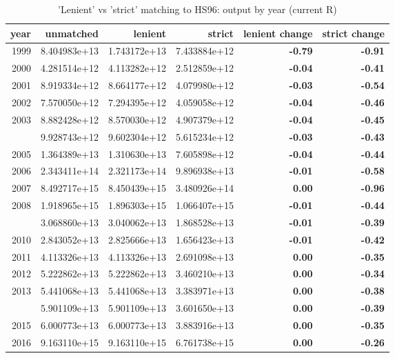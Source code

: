 \begin{table}

\caption{\label{tab:}'Lenient' vs 'strict' matching to HS96: output by year (current R)}
\centering
\begin{tabular}[t]{rrrr>{\bfseries}r>{\bfseries}r}
\toprule
year & unmatched & lenient & strict & lenient change & strict change\\
\midrule
1999 & 8.404983e+13 & 1.743172e+13 & 7.433884e+12 & -0.79 & -0.91\\
2000 & 4.281514e+12 & 4.113282e+12 & 2.512859e+12 & -0.04 & -0.41\\
2001 & 8.919334e+12 & 8.664177e+12 & 4.079980e+12 & -0.03 & -0.54\\
2002 & 7.570050e+12 & 7.294395e+12 & 4.059058e+12 & -0.04 & -0.46\\
2003 & 8.882428e+12 & 8.570030e+12 & 4.907379e+12 & -0.04 & -0.45\\
\addlinespace
2004 & 9.928743e+12 & 9.602304e+12 & 5.615234e+12 & -0.03 & -0.43\\
2005 & 1.364389e+13 & 1.310630e+13 & 7.605898e+12 & -0.04 & -0.44\\
2006 & 2.343411e+14 & 2.321173e+14 & 9.896938e+13 & -0.01 & -0.58\\
2007 & 8.492717e+15 & 8.450439e+15 & 3.480926e+14 & 0.00 & -0.96\\
2008 & 1.918965e+15 & 1.896303e+15 & 1.066407e+15 & -0.01 & -0.44\\
\addlinespace
2009 & 3.068860e+13 & 3.040062e+13 & 1.868528e+13 & -0.01 & -0.39\\
2010 & 2.843052e+13 & 2.825666e+13 & 1.656423e+13 & -0.01 & -0.42\\
2011 & 4.113326e+13 & 4.113326e+13 & 2.691098e+13 & 0.00 & -0.35\\
2012 & 5.222862e+13 & 5.222862e+13 & 3.460210e+13 & 0.00 & -0.34\\
2013 & 5.441068e+13 & 5.441068e+13 & 3.383971e+13 & 0.00 & -0.38\\
\addlinespace
2014 & 5.901109e+13 & 5.901109e+13 & 3.601650e+13 & 0.00 & -0.39\\
2015 & 6.000773e+13 & 6.000773e+13 & 3.883916e+13 & 0.00 & -0.35\\
2016 & 9.163110e+15 & 9.163110e+15 & 6.761738e+15 & 0.00 & -0.26\\
\bottomrule
\end{tabular}
\end{table}

